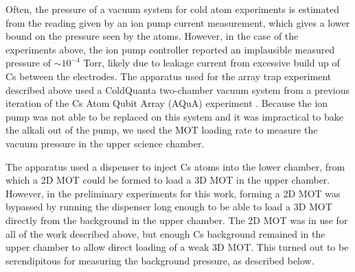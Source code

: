 Often, the pressure of a vacuum system for cold atom experiments is estimated from the reading given by an ion pump current measurement, which gives a lower bound on the pressure seen by the atoms. However, in the case of the experiments above, the ion pump controller reported an implausible measured pressure of $\sim 10^{-4}$ Torr, likely due to leakage current from excessive build up of Cs between the electrodes. The apparatus used for the array trap experiment described above used a ColdQuanta two-chamber vacuum system from a previous iteration of the Cs Atom Qubit Array (AQuA) experiment \cite{Graham2018}. Because the ion pump was not able to be replaced on this system and it was impractical to bake the alkali out of the pump, we used the MOT loading rate to measure the vacuum pressure in the upper science chamber.  

The apparatus used a  dispenser to inject Cs atoms into the lower chamber, from which a 2D MOT could be formed to load a 3D MOT in the upper chamber. However, in the preliminary experiments for this work, forming a 2D MOT was bypassed by running the dispenser long enough to be able to load a 3D MOT directly from the background in the upper chamber. The 2D MOT was in use for all of the work described above, but enough Cs background remained in the upper chamber to allow direct loading of a weak 3D MOT. This turned out to be serendipitous for measuring the background pressure, as described below. 

